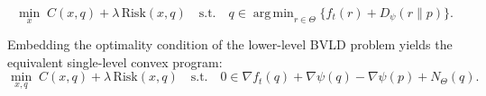 \documentclass[10pt,a4paper]{amsart}
\DeclareMathOperator*{\argmin}{arg\,min}
\begin{document}
\begin{equation}
\min_{x}\; C(x,q)+\lambda\,\mathrm{Risk}(x,q)
\quad
\text{s.t.}\quad
q\in\argmin_{r\in\Theta}\{f_t(r)+D_\psi(r\|p)\}.
\label{eq:bilevel}
\end{equation}

\begin{proposition}
\label{prop:bilevel}
Embedding the optimality condition of the lower-level BVLD problem 
yields the equivalent single-level convex program:
\begin{equation}
\min_{x,q}\;
C(x,q)+\lambda\,\mathrm{Risk}(x,q)
\quad
\text{s.t.}\quad
0\in\nabla f_t(q)+\nabla\psi(q)-\nabla\psi(p)+N_\Theta(q).
\label{eq:singlelevel}
\end{equation}
\end{proposition}
\end{document}
